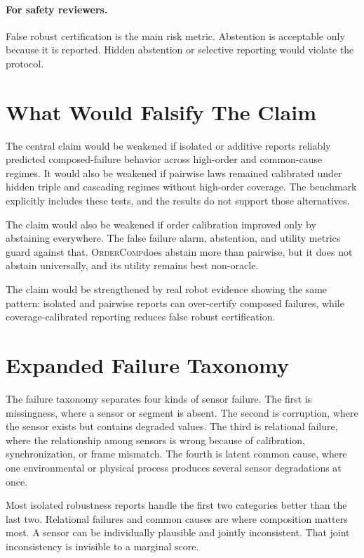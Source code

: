 \documentclass{article}
\newcommand{\method}{\textsc{OrderComp}}
\begin{document}
\paragraph{For safety reviewers.}
False robust certification is the main risk metric. Abstention is acceptable only because it is reported. Hidden abstention or selective reporting would violate the protocol.

\section{What Would Falsify The Claim}

The central claim would be weakened if isolated or additive reports reliably predicted composed-failure behavior across high-order and common-cause regimes. It would also be weakened if pairwise laws remained calibrated under hidden triple and cascading regimes without high-order coverage. The benchmark explicitly includes these tests, and the results do not support those alternatives.

The claim would also be weakened if order calibration improved only by abstaining everywhere. The false failure alarm, abstention, and utility metrics guard against that. \method does abstain more than pairwise, but it does not abstain universally, and its utility remains best non-oracle.

The claim would be strengthened by real robot evidence showing the same pattern: isolated and pairwise reports can over-certify composed failures, while coverage-calibrated reporting reduces false robust certification.

\section{Expanded Failure Taxonomy}

The failure taxonomy separates four kinds of sensor failure. The first is missingness, where a sensor or segment is absent. The second is corruption, where the sensor exists but contains degraded values. The third is relational failure, where the relationship among sensors is wrong because of calibration, synchronization, or frame mismatch. The fourth is latent common cause, where one environmental or physical process produces several sensor degradations at once.

Most isolated robustness reports handle the first two categories better than the last two. Relational failures and common causes are where composition matters most. A sensor can be individually plausible and jointly inconsistent. That joint inconsistency is invisible to a marginal score.
\end{document}
